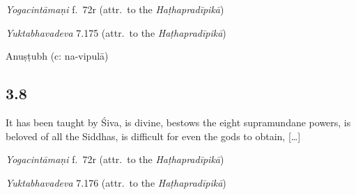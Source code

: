 \begin{ekdosis}
\begin{testimonia}[hp03_007]
\emph{Yogacintāmaṇi} f.~72r (attr.~to the \emph{Haṭhapradīpikā})
\begin{versinnote}
\end{versinnote}

\emph{Yuktabhavadeva} 7.175 (attr.~to the \emph{Haṭhapradīpikā})
\begin{versinnote}
\end{versinnote}

\end{testimonia}


\begin{metre}[hp03_007]
Anuṣṭubh (c: na-vipulā)
\end{metre}

\subsection*{3.8}
\begin{translation}[hp03_008]
It has been taught by Śiva, is divine, bestows the eight supramundane powers, is beloved of all the Siddhas, is difficult for even the gods to obtain, [\dots] 
\end{translation}

\begin{sources}[hp03_008]
\end{sources}

\begin{testimonia}[hp03_008]
\emph{Yogacintāmaṇi} f.~72r (attr.~to the \emph{Haṭhapradīpikā})
\begin{versinnote}
\end{versinnote}

\emph{Yuktabhavadeva} 7.176 (attr.~to the \emph{Haṭhapradīpikā})
\begin{versinnote}
\end{versinnote}
\end{testimonia}


\end{ekdosis}
